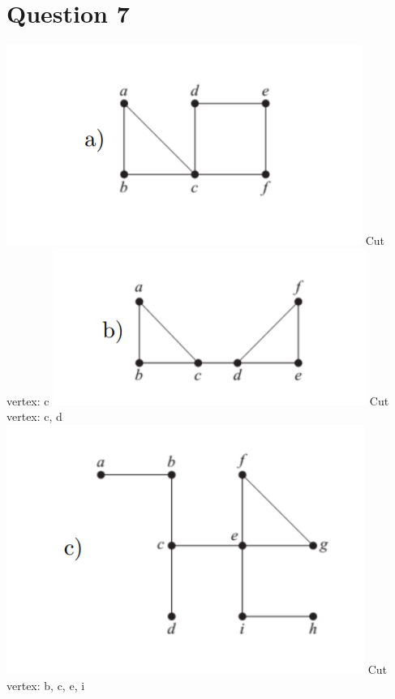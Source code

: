 \documentclass{article}
\begin{document}
\section*{Question 7}
\includegraphics[]{Question 7/connectivity_7.1.png}
\newline
Cut vertex: c
\newline
\includegraphics[]{Question 7/connectivity_7.2.png}
\newline
Cut vertex: c, d
\newline
\includegraphics[]{Question 7/connectivity_7.3.png}
\newline
Cut vertex: b, c, e, i
\end{document}
